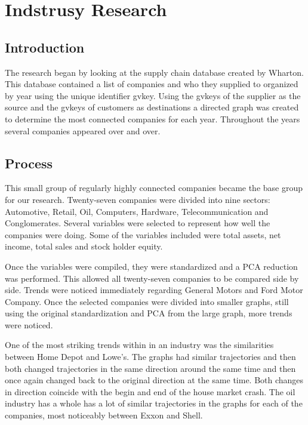 \chapter{Indstrusy Research}

\section{Introduction}

	The research began by looking at the supply chain database created by Wharton. This database contained a list of companies and who they supplied to organized by year using the unique identifier gvkey. Using the gvkeys of the supplier as the source and the gvkeys of customers as destinations a directed graph was created to determine the most connected companies for each year. Throughout the years several companies appeared over and over. 
\section{Process}

	This small group of regularly highly connected companies became the base group for our research. Twenty-seven companies were divided into nine sectors: Automotive, Retail, Oil, Computers, Hardware, Telecommunication and Conglomerates. Several variables were selected to represent how well the companies were doing. Some of the variables included were total assets, net income, total sales and stock holder equity.\\
\newline

	Once the variables were compiled, they were standardized and a PCA reduction was performed. This allowed all twenty-seven companies to be compared side by side. Trends were noticed immediately regarding General Motors and Ford Motor Company. Once the selected companies were divided into smaller graphs, still using the original standardization and PCA from the large graph, more trends were noticed. \\
\newline

	One of the most striking trends within in an industry was the similarities between Home Depot and Lowe’s. The graphs had similar trajectories and then both changed trajectories in the same direction around the same time and then once again changed back to the original direction at the same time. Both changes in direction coincide with the begin and end of the house market crash. The oil industry has a whole has a lot of similar trajectories in the graphs for each of the companies, most noticeably between Exxon and Shell. \\
\newline

